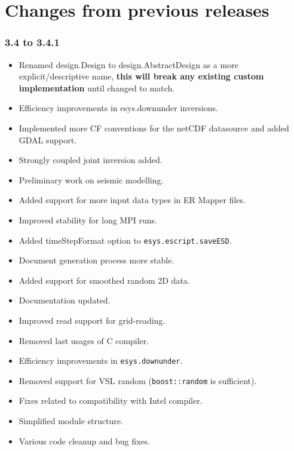 
%
%
%

\chapter{Changes from previous releases}
\label{app:changes}

\subsection*{3.4 to 3.4.1}
\begin{itemize}
 \item Renamed design.Design to design.AbstractDesign as a more explicit/descriptive name, {\bf this will break any existing custom implementation} until changed to match.

 \item Efficiency improvements in esys.downunder inversions.
 \item Implemented more CF conventions for the netCDF datasource and added GDAL support.
 \item Strongly coupled joint inversion added.
 \item Preliminary work on seismic modelling.
 \item Added support for more input data types in ER Mapper files.
 \item Improved stability for long MPI runs.
 \item Added timeStepFormat option to \texttt{esys.escript.saveESD}.
 \item Document generation process more stable.
 \item Added support for smoothed random 2D data.
 \item Documentation updated.
 \item Improved read support for grid-reading.
 \item Removed last usages of C compiler.
 \item Efficiency improvements in \texttt{esys.downunder}.
 \item Removed support for VSL random (\texttt{boost::random} is sufficient).
 \item Fixes related to compatibility with Intel compiler.
 \item Simplified module structure.
 \item Various code cleanup and bug fixes.
\end{itemize}

